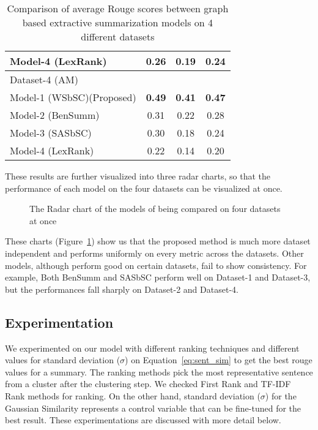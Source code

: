 \begin{table}[]
\begin{tabular}{lccc}
         Model-4 (LexRank)~\cite{Erkan-lexRank-2004}                    & 0.26          & 0.19          & 0.24          \\\hline
         Dataset-4 (AM)                                                 &               &               &               \\\hline
         Model-1 (WSbSC)(Proposed)                                      & \textbf{0.49} & \textbf{0.41} & \textbf{0.47} \\
         Model-2 (BenSumm)~\cite{chowdhury-etal-2021-tfidf-clustering}  & 0.31          & 0.22          & 0.28          \\
         Model-3 (SASbSC)~\cite{roychowdhury-etal-2022-spectral-base}   & 0.30          & 0.18          & 0.24          \\
         Model-4 (LexRank)~\cite{Erkan-lexRank-2004}                    & 0.22          & 0.14          & 0.20          \\
    \end{tabular}
    \caption{Comparison of average Rouge scores between graph based extractive summarization models on 4 different datasets}
    \label{tab:result_comparison-1}
\end{table}

These results are further visualized into three radar charts,
so that the performance of each model on the four datasets can be visualized at once.

\begin{figure}
    \centering
    
    \caption{The Radar chart of the models of being compared on four datasets at once}
    \label{fig:radarchart}
 \end{figure}

These charts (Figure~\ref{fig:radarchart})
show us that the proposed method is much more dataset independent and performs
uniformly on every metric across the datasets.
Other models, although perform good on certain datasets, fail to show consistency.
For example, Both BenSumm and SASbSC perform well on Dataset-1 and Dataset-3, but
the performances fall sharply on Dataset-2 and Dataset-4.


\subsection{Experimentation}\label{subsec:experimentation}
We experimented on our model with different ranking techniques and different values for standard deviation ($\sigma$)
on Equation~\ref{eq:sent_sim} to get the best rouge values for a summary.
The ranking methods pick the most representative sentence from a cluster after the clustering step.
We checked First Rank and TF-IDF Rank methods for ranking.
On the other hand, standard deviation ($\sigma$) for the Gaussian Similarity represents a control variable
that can be fine-tuned for the best result.
These experimentations are discussed with more detail below.\\

